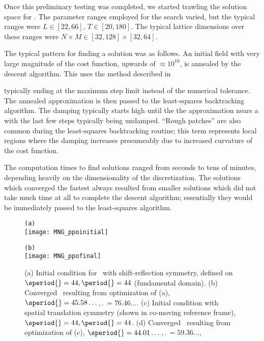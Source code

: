 Once this preliminary testing was completed, we started trawling the solution space
for \twots. The parameter ranges employed for the search varied, but the typical ranges were
$L \in [22, 66]$, $T \in [20, 180]$. The typical lattice dimensions over these ranges
were $N\times M \in [32, 128] \times [32, 64]$.

The typical pattern for finding a solution was as follows. An initial field with very
large magnitude of the cost function, upwards of $\approx 10^{10}$, is annealed by the descent
algorithm.
This uses the method described in %


 typically ending at the maximum step limit instead of the numerical
tolerance. The annealed approximation is then passed
to the least-squares backtracking algorithm. The damping
typically starts high until the the approximation nears a \twot with
the last few steps typically being undamped.
``Rough patches'' are also common during the least-squares
backtracking routine; this term represents local regions where the damping increases
presumeably due to increased curvature of the cost function.

The computation times to find solutions ranged from seconds to tens of minutes, depending
heavily on the dimensionality of the discretization. The solutions which converged the fastest always resulted
from smaller solutions which did not take much time at all to complete the descent algorithm;
essentially they would be immediately passed to the least-squares algorithm.


\begin{figure}
\begin{minipage}[height=.05\textheight]{.5\textwidth}
\centering
\small{\texttt{(a)}} \\
\texttt{[image: MNG\_ppoinitial]}
\end{minipage}
\begin{minipage}[height=.2\textheight]{.5\textwidth}
\centering
\small{\texttt{(b)}} \\
\texttt{[image: MNG\_ppofinal]}
\end{minipage}

\caption{ \label{fig:ppo1}
(a) Initial condition for \twot\ with shift-reflection symmetry, defined on
$\speriod{}=44,\period{}=44$ (fundamental domain). (b) Converged \twot\
resulting from optimization of (a), $\speriod{}= 45.58\dots$,$\period{}= 76.46\dots$.
(c) Initial condition with spatial translation symmetry (shown in co-moving reference frame),
$\speriod{}=44,\period{}=44$. (d) Converged \twot\ resulting from optimization
of (c), $\speriod{} = 44.01\dots$,$\period{}=59.36\dots$,}
\end{figure}

